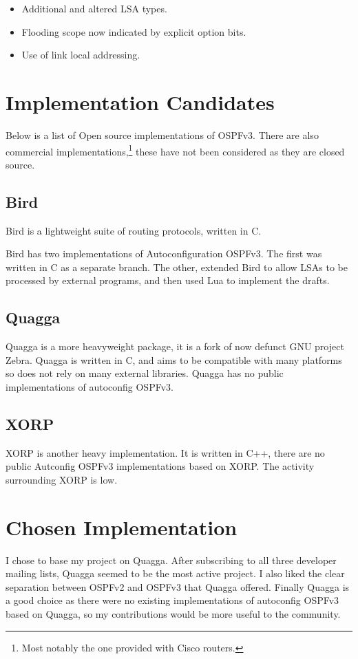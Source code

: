 \documentclass[12pt,a4paper,twoside]{report}
\begin{document}
\begin{itemize}
	\item Additional and altered LSA types.
	\item Flooding scope now indicated by explicit option bits.
	\item Use of link local addressing.
\end{itemize}

\section{Implementation Candidates}
Below is a list of Open source implementations of OSPFv3\@. There are also
commercial implementations,\footnote{Most notably the one provided with Cisco
routers.} these have not been considered as they are closed source. 

\subsection{Bird}
Bird\cite{BirdHome} is a lightweight suite of routing protocols, written
in C. 

Bird has two implementations of Autoconfiguration OSPFv3. The first was written
in C as a separate branch. The other, extended Bird to allow LSAs to be
processed by external programs, and then used Lua to implement the drafts.

\subsection{Quagga}
Quagga\cite{QuaggaHome} is a more heavyweight package, it is a fork of now
defunct GNU project Zebra. Quagga is written in C, and aims to be
compatible with many platforms so does not rely on many external libraries.
Quagga has no public implementations of autoconfig OSPFv3.

\subsection{XORP}
XORP\cite{XORPHome} is another heavy implementation. It is written in C++,
there are no public Autconfig OSPFv3 implementations based on XORP\@. The
activity surrounding XORP is low. 

\section{Chosen Implementation}
I chose to base my project on Quagga. After subscribing to all three developer
mailing lists, Quagga seemed to be the most active project.  I also liked the
clear separation between OSPFv2 and OSPFv3 that Quagga offered.  Finally Quagga
is a good choice as there were no existing implementations of autoconfig OSPFv3
based on Quagga, so my contributions would be more useful to the community.
\end{document}
